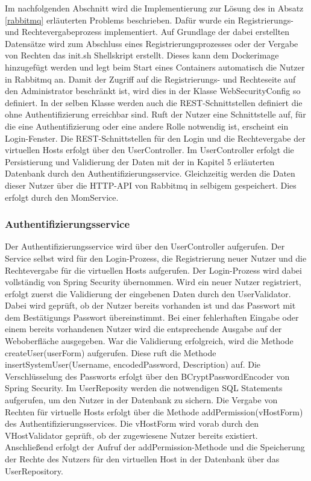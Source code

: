 Im nachfolgenden Abschnitt wird die Implementierung zur Lösung des in Absatz \ref{rabbitmq} erläuterten Problems beschrieben. Dafür wurde ein Registrierungs- und Rechtevergabeprozess implementiert. Auf Grundlage der dabei erstellten Datensätze wird zum Abschluss eines Registrierungsprozesses oder der Vergabe von Rechten das init.sh Shellskript erstellt. Dieses kann dem Dockerimage hinzugefügt werden und legt beim Start eines Containers automatisch die Nutzer in Rabbitmq an.
Damit der Zugriff auf die Registrierungs- und Rechteseite auf den Administrator beschränkt ist, wird dies in der Klasse WebSecurityConfig so definiert. In der selben Klasse werden auch die REST-Schnittstellen definiert die ohne Authentifizierung erreichbar sind. Ruft der Nutzer eine Schnittstelle auf, für die eine Authentifizierung oder eine andere Rolle notwendig ist, erscheint ein Login-Fenster. Die REST-Schnittstellen für den Login und die Rechtevergabe der virtuellen Hosts erfolgt über den UserController. Im UserController erfolgt die Persistierung und Validierung der Daten mit der in Kapitel 5 erläuterten Datenbank durch den Authentifizierungsservice. Gleichzeitig werden die Daten dieser Nutzer über die HTTP-API von Rabbitmq in selbigem gespeichert. Dies erfolgt durch den MomService.
\subsubsection{Authentifizierungsservice}\label{momservice}
Der Authentifizierungsservice wird über den UserController aufgerufen. Der Service selbst wird für den Login-Prozess, die Registrierung neuer Nutzer und die Rechtevergabe für die virtuellen Hosts aufgerufen. Der Login-Prozess wird dabei vollständig von Spring Security übernommen. Wird ein neuer Nutzer registriert, erfolgt zuerst die Validierung der eingebenen Daten durch den UserValidator. Dabei wird geprüft, ob der Nutzer bereits vorhanden ist und das Passwort mit dem Bestätigungs Passwort übereinstimmt. Bei einer fehlerhaften Eingabe oder einem bereits vorhandenen Nutzer wird die entsprechende Ausgabe auf der Weboberfläche ausgegeben. War die Validierung erfolgreich, wird die Methode createUser(userForm) aufgerufen. Diese ruft die Methode insertSystemUser(Username, encodedPassword, Description) auf. Die Verschlüsselung des Passworts erfolgt über den BCryptPasswordEncoder von Spring Security. Im UserReposity werden die notwendigen SQL Statements aufgerufen, um den Nutzer in der Datenbank zu sichern. Die Vergabe von Rechten für virtuelle Hosts erfolgt über die Methode addPermission(vHostForm) des Authentifizierungsservices. Die vHostForm wird vorab durch den VHostValidator geprüft, ob der zugewiesene Nutzer bereits existiert. Anschließend erfolgt der Aufruf der addPermission-Methode und die Speicherung der Rechte des Nutzers für den virtuellen Host in der Datenbank über das UserRepository.
